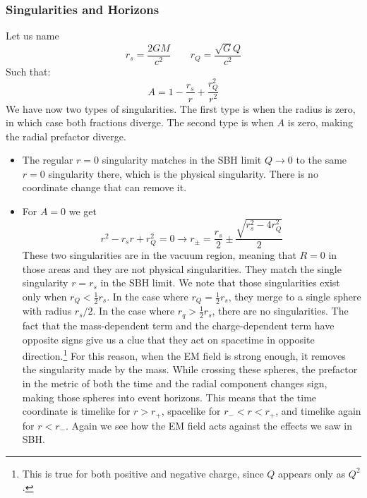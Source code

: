 \documentclass{article}
\begin{document}
\subsubsection{Singularities and Horizons}
Let us name
\begin{equation}
    r_s = \frac{2GM}{c^2}
    \qquad
    r_Q = \frac{\sqrt{G}Q}{c^2}
\end{equation}
Such that:
\begin{equation}
    A = 1 - \frac{r_s}{r} + \frac{r_Q^2}{r^2}
\end{equation}
We have now two types of singularities. The first type is when the radius is zero, in which case both fractions diverge. The second type is when $A$ is zero, making the radial prefactor diverge.
\begin{itemize}
    \item The regular $r = 0$ singularity matches in the SBH limit $Q \rightarrow 0$ to the same $r = 0$ singularity there, which is the physical singularity. There is no coordinate change that can remove it.
    \item For $A = 0$ we get
    \begin{equation}
        r^2 - r_s r + r_Q^2 = 0 \rightarrow r_{\pm} = \frac{r_s}{2} \pm \frac{\sqrt{r_s^2 - 4r_Q^2}}{2}
    \end{equation}
    These two singularities are in the vacuum region, meaning that $R = 0$ in those areas and they are not physical singularities. They match the single singularity $r = r_s$ in the SBH limit. We note that those singularities exist only when $r_Q < \frac{1}{2}r_s$. In the case where $r_Q = \frac{1}{2}r_s$, they merge to a single sphere with radius $r_s/2$. In the case where $r_q > \frac{1}{2}r_s$, there are no singularities.
    \newline
    The fact that the mass-dependent term and the charge-dependent term have opposite signs give us a clue that they act on spacetime in opposite direction.\footnote{This is true for both positive and negative charge, since $Q$ appears only as $Q^2$.} For this reason, when the EM field is strong enough, it removes the singularity made by the mass.
    \newline
    While crossing these spheres, the prefactor in the metric of both the time and the radial component changes sign, making those spheres into event horizons. This means that the time coordinate is timelike for $r > r_{+}$, spacelike for $r_{-} < r < r_{+}$, and timelike again for $r < r_{-}$. Again we see how the EM field acts against the effects we saw in SBH.
\end{itemize}
\end{document}
